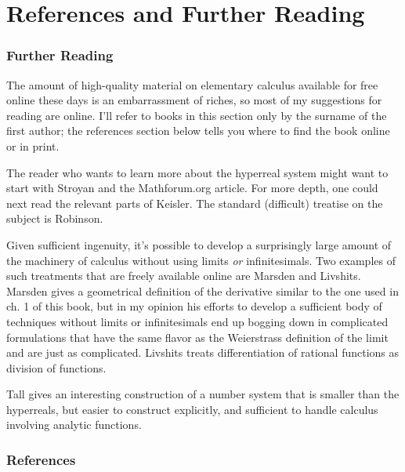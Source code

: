 \setcounter{chapter}{4}


\chapter*{References and Further Reading}\label{ch:further-reading}
\subsection{Further Reading}

The amount of high-quality material on elementary calculus available for free online
these days is an embarrassment of riches, so most of my suggestions for reading are
online. I'll refer to books in this section only by the surname of the first author;
the references section below tells you where to find the book online or in print.

The reader who
wants to learn more about the hyperreal system might want to start
with Stroyan and the Mathforum.org article.
For more depth, one could next read the relevant parts of Keisler.
The standard (difficult) treatise on the subject is Robinson.

Given sufficient ingenuity, it's possible to develop a surprisingly large amount of
the machinery of calculus without using limits \emph{or} infinitesimals.
Two examples of such treatments that are freely available online are
Marsden and Livshits. Marsden gives a geometrical definition
of the derivative similar to the one used in ch. 1 of this book, but in my opinion
his efforts to develop a sufficient body of techniques without limits or infinitesimals
end up bogging down in complicated formulations that have the same flavor as the
Weierstrass definition of the limit and are just as complicated. Livshits
treats differentiation of rational functions as division of functions.

Tall gives an interesting construction of a number system that is smaller than the hyperreals,
but easier to construct explicitly, and sufficient to handle calculus involving analytic functions.

\subsection{References}\label{references}

